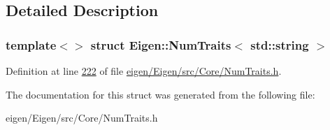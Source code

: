 \subsection{Detailed Description}
\subsubsection*{template$<$$>$\newline
struct Eigen\+::\+Num\+Traits$<$ std\+::string $>$}



Definition at line \hyperlink{eigen_2_eigen_2src_2_core_2_num_traits_8h_source_l00222}{222} of file \hyperlink{eigen_2_eigen_2src_2_core_2_num_traits_8h_source}{eigen/\+Eigen/src/\+Core/\+Num\+Traits.\+h}.



The documentation for this struct was generated from the following file\+:\begin{DoxyCompactItemize}
\item 
eigen/\+Eigen/src/\+Core/\+Num\+Traits.\+h\end{DoxyCompactItemize}
